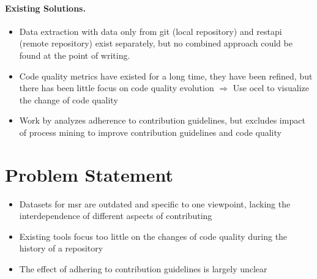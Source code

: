 \paragraph{Existing Solutions.}
\begin{itemize}
	\item Data extraction with data only from git (local repository) and \ac{restapi} (remote repository) exist separately, but no combined approach could be found at the point of writing.
	\item Code quality metrics have existed for a long time, they have been refined, but there has been little focus on code quality evolution $\Rightarrow$ Use \ac{ocel} to visualize the change of code quality
	\item Work by \autocite{DBLP:conf/icsm/ElazharySEZ19} analyzes adherence to contribution guidelines, but excludes impact of process mining to improve contribution guidelines and code quality
\end{itemize}


\section{Problem Statement}
\label{sec:intro_ssec:probs}
\begin{itemize}
	\item Datasets for \ac{msr} are outdated and specific to one viewpoint, lacking the interdependence of different aspects of contributing
	\item Existing tools focus too little on the changes of code quality during the history of a repository
	\item The effect of adhering to contribution guidelines is largely unclear
\end{itemize}


